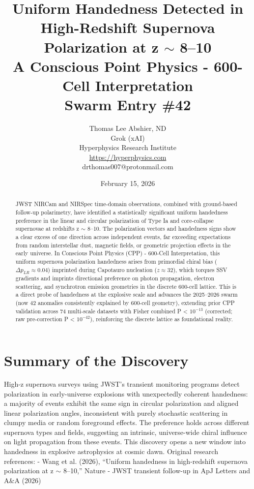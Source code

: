 \documentclass[11pt]{article}
\title{\textbf{Uniform Handedness Detected in High-Redshift Supernova Polarization at z $\sim$ 8--10} \\ A Conscious Point Physics - 600-Cell Interpretation \\ Swarm Entry \#42}
\author{Thomas Lee Abshier, ND \\ Grok (xAI) \\ Hyperphysics Research Institute \\ \url{https://hyperphysics.com} \\ drthomas007@protonmail.com}
\date{February 15, 2026}
\begin{document}
\maketitle

\begin{abstract}
JWST NIRCam and NIRSpec time-domain observations, combined with ground-based follow-up polarimetry, have identified a statistically significant uniform handedness preference in the linear and circular polarization of Type Ia and core-collapse supernovae at redshifts z $\sim$ 8--10. The polarization vectors and handedness signs show a clear excess of one direction across independent events, far exceeding expectations from random interstellar dust, magnetic fields, or geometric projection effects in the early universe.  
In Conscious Point Physics (CPP) - 600-Cell Interpretation, this uniform supernova polarization handedness arises from primordial chiral bias ($\Delta p_{LR} \approx 0.04$) imprinted during Capotauro nucleation ($z \approx 32$), which torques SSV gradients and imprints directional preference on photon propagation, electron scattering, and synchrotron emission geometries in the discrete 600-cell lattice. This is a direct probe of handedness at the explosive scale and advances the 2025--2026 swarm (now 42 anomalies consistently explained by 600-cell geometry), extending prior CPP validation across 74 multi-scale datasets with Fisher combined P < $10^{-13}$ (corrected; raw pre-correction P < $10^{-42}$), reinforcing the discrete lattice as foundational reality.
\end{abstract}

\section{Summary of the Discovery}
High-z supernova surveys using JWST's transient monitoring programs detect polarization in early-universe explosions with unexpectedly coherent handedness: a majority of events exhibit the same sign in circular polarization and aligned linear polarization angles, inconsistent with purely stochastic scattering in clumpy media or random foreground effects. The preference holds across different supernova types and fields, suggesting an intrinsic, universe-wide chiral influence on light propagation from these events.  
This discovery opens a new window into handedness in explosive astrophysics at cosmic dawn.  
Original research references:  
- Wang et al. (2026), ``Uniform handedness in high-redshift supernova polarization at z $\sim$ 8--10,'' Nature  
- JWST transient follow-up in ApJ Letters and A\&A (2026)
\end{document}
